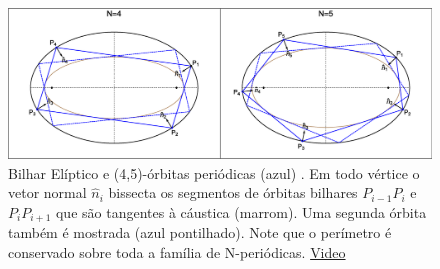 
\begin{figure}
    \centering
    \includegraphics[scale=0.35]{pics_proposal/0000_n4n5.eps}
    \caption{Bilhar Elíptico e (4,5)-órbitas periódicas (azul) . Em todo vértice o vetor normal $\hat{n}_i$ bissecta os segmentos   de órbitas bilhares  $P_{i-1} P_{i}$ e $P_i P_{i+1}$ que são tangentes à cáustica (marrom). Uma segunda órbita também é mostrada (azul pontilhado). Note que o perímetro é conservado sobre toda a família de N-periódicas.   \href{https://youtu.be/Y3q35DObfZU}{Video}}
    \label{fig:n4n5}
\end{figure}
 \newpage
